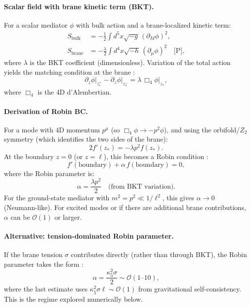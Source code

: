 \paragraph{Scalar field with brane kinetic term (BKT).}
For a scalar mediator $\phi$ with bulk action and a brane-localized kinetic term:
\begin{align}
    S_{\text{bulk}} &= -\frac{1}{2} \int d^5x \sqrt{-g} \, (\partial_M \phi)^2, \\
    S_{\text{brane}} &= -\frac{\lambda}{2} \int d^4x \sqrt{-h} \, (\partial_\mu \phi)^2 \quad \text{[P]},
    \label{eq:attemptF_BKT}
\end{align}
where $\lambda$ is the BKT coefficient (dimensionless). Variation of the total action
yields the matching condition at the brane \tagDc{}:
\begin{equation}
    \left. \partial_z \phi \right|_{z_*^+} - \left. \partial_z \phi \right|_{z_*^-}
    = \lambda \, \Box_4 \phi \big|_{z_*},
    \label{eq:attemptF_matching}
\end{equation}
where $\Box_4$ is the 4D d'Alembertian.

\paragraph{Derivation of Robin BC.}
For a mode with 4D momentum $p^\mu$ (so $\Box_4 \phi \to -p^2 \phi$), and using the
orbifold/$Z_2$ symmetry (which identifies the two sides of the brane):
\begin{equation}
    2 f'(z_*) = -\lambda p^2 f(z_*).
\end{equation}
At the boundary $z = 0$ (or $z = \ell$), this becomes a Robin condition \tagDc{}:
\begin{equation}
    \boxed{
    f'(\text{boundary}) + \alpha \, f(\text{boundary}) = 0,
    }
    \label{eq:attemptF_Robin}
\end{equation}
where the Robin parameter is:
\begin{equation}
    \alpha = \frac{\lambda p^2}{2} \quad \text{(from BKT variation)}.
    \label{eq:attemptF_alpha_BKT}
\end{equation}
For the ground-state mediator with $m^2 = p^2 \ll 1/\ell^2$, this gives $\alpha \to 0$
(Neumann-like). For excited modes or if there are additional brane contributions,
$\alpha$ can be $\mathcal{O}(1)$ or larger.

\paragraph{Alternative: tension-dominated Robin parameter.}
If the brane tension $\sigma$ contributes directly (rather than through BKT), the
Robin parameter takes the form \tagP{}:
\begin{equation}
    \alpha = \frac{\kappa_5^2 \sigma}{2} \sim \mathcal{O}(1\text{--}10),
    \label{eq:attemptF_alpha_tension}
\end{equation}
where the last estimate uses $\kappa_5^2 \sigma \ell \sim \mathcal{O}(1)$ from
gravitational self-consistency. This is the regime explored numerically below.

